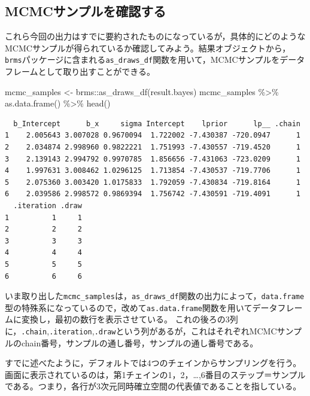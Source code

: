 \documentclass[
  a4paper,
]{ltjsbook}
\newenvironment{Shaded}{\begin{snugshade}}{\end{snugshade}}
\newcommand{\FunctionTok}[1]{\textcolor[rgb]{0.28,0.35,0.67}{#1}}
\newcommand{\NormalTok}[1]{\textcolor[rgb]{0.00,0.23,0.31}{#1}}
\newcommand{\OtherTok}[1]{\textcolor[rgb]{0.00,0.23,0.31}{#1}}
\newcommand{\SpecialCharTok}[1]{\textcolor[rgb]{0.37,0.37,0.37}{#1}}
\begin{document}
\subsection{MCMCサンプルを確認する}\label{mcmcux30b5ux30f3ux30d7ux30ebux3092ux78baux8a8dux3059ux308b}

これら今回の出力はすでに要約されたものになっているが，具体的にどのようなMCMCサンプルが得られているか確認してみよう。結果オブジェクトから，\texttt{brms}パッケージに含まれる\texttt{as\_draws\_df}関数を用いて，MCMCサンプルをデータフレームとして取り出すことができる。

\begin{Shaded}
\begin{Highlighting}[]
\NormalTok{mcmc\_samples }\OtherTok{\textless{}{-}}\NormalTok{ brms}\SpecialCharTok{::}\FunctionTok{as\_draws\_df}\NormalTok{(result.bayes)}
\NormalTok{mcmc\_samples }\SpecialCharTok{\%\textgreater{}\%}
  \FunctionTok{as.data.frame}\NormalTok{() }\SpecialCharTok{\%\textgreater{}\%}
  \FunctionTok{head}\NormalTok{()}
\end{Highlighting}
\end{Shaded}

\begin{verbatim}
  b_Intercept      b_x     sigma Intercept    lprior      lp__ .chain
1    2.005643 3.007028 0.9670094  1.722002 -7.430387 -720.0947      1
2    2.034874 2.998960 0.9822221  1.751993 -7.430557 -719.4520      1
3    2.139143 2.994792 0.9970785  1.856656 -7.431063 -723.0209      1
4    1.997631 3.008462 1.0296125  1.713854 -7.430537 -719.7706      1
5    2.075360 3.003420 1.0175833  1.792059 -7.430834 -719.8164      1
6    2.039586 2.998572 0.9869394  1.756742 -7.430591 -719.4091      1
  .iteration .draw
1          1     1
2          2     2
3          3     3
4          4     4
5          5     5
6          6     6
\end{verbatim}

いま取り出した\texttt{mcmc\_samples}は，\texttt{as\_draws\_df}関数の出力によって，\texttt{data.frame}型の特殊系になっているので，改めて\texttt{as.data.frame}関数を用いてデータフレームに変換し，最初の数行を表示させている。
これの後ろの3列に，\texttt{.chain},\texttt{.iteration},\texttt{.draw}という列があるが，これはそれぞれMCMCサンプルのchain番号，サンプルの通し番号，サンプルの通し番号である。

すでに述べたように，デフォルトでは4つのチェインからサンプリングを行う。画面に表示されているのは，第1チェインの1，2，\ldots,6番目のステップ＝サンプルである。つまり，各行が3次元同時確立空間の代表値であることを指している。
\end{document}
